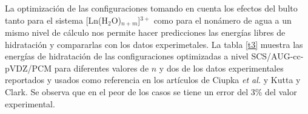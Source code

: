 %

La optimizaci\'on de las configuraciones tomando en cuenta los 
efectos del bulto tanto para el sistema [Ln(H$_2$O)$_{n+m}$]$^{3+}$
como para el non\'amero de agua a un mismo nivel de c\'alculo nos
permite hacer predicciones las energ\'ias libres de hidrataci\'on y 
compararlas con los datos experimetales. La tabla \ref{t3} muestra 
las energ\'ias de hidrataci\'on de las configuraciones optimizadas a 
nivel SCS/AUG-cc-pVDZ/PCM para diferentes valores de $n$ y dos de los
datos experimentales reportados y usados como referencia en los 
art\'iculos de Ciupka {\it et al.} y Kutta y Clark. Se observa que en
el peor de los casos se tiene un error del 3\% del valor experimental.
%
%
\linespread{1.}

\linespread{1.75}
